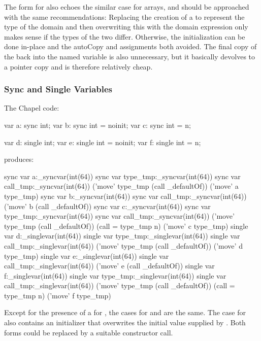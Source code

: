 The form for  also echoes the similar case for arrays, and should be approached
with the same recommendations: Replacing the creation of a  to represent
the type of the domain and then overwriting this with the domain expression only makes
sense if the types of the two differ.  Otherwise, the initialization can be done in-place
and the autoCopy and assignments both avoided.  The final copy of the  back
into the named variable is also unnecessary, but it basically devolves to a pointer copy
and is therefore relatively cheap.

\subsubsection{Sync and Single Variables}

The Chapel code:
\begin{chapel}
  var a: sync int;
  var b: sync int = noinit;
  var c: sync int = n;

  var d: single int;
  var e: single int = noinit;
  var f: single int = n;
\end{chapel}
\noindent
produces:
\begin{numberedchapel}
    sync var a:_syncvar(int(64))
    {
      sync var type_tmp:_syncvar(int(64))
      sync var call_tmp:_syncvar(int(64))
      ('move' type_tmp (call _defaultOf))
      ('move' a type_tmp)
    }
    sync var b:_syncvar(int(64))
    sync var call_tmp:_syncvar(int(64))
    ('move' b (call _defaultOf))
    sync var c:_syncvar(int(64))
    {
      sync var type_tmp:_syncvar(int(64))
      sync var call_tmp:_syncvar(int(64))
      ('move' type_tmp (call _defaultOf))
      (call = type_tmp n)
      ('move' c type_tmp)
    }
    single var d:_singlevar(int(64))
    {
      single var type_tmp:_singlevar(int(64))
      single var call_tmp:_singlevar(int(64))
      ('move' type_tmp (call _defaultOf))
      ('move' d type_tmp)
    }
    single var e:_singlevar(int(64))
    single var call_tmp:_singlevar(int(64))
    ('move' e (call _defaultOf))
    single var f:_singlevar(int(64))
    {
      single var type_tmp:_singlevar(int(64))
      single var call_tmp:_singlevar(int(64))
      ('move' type_tmp (call _defaultOf))
      (call = type_tmp n)
      ('move' f type_tmp)
    }
\end{numberedchapel}

Except for the presence of a  for , the cases for  and
 are the same.  The case for  also contains an initializer that
overwrites the initial value supplied by .  Both forms could be replaced
by a suitable constructor call.

